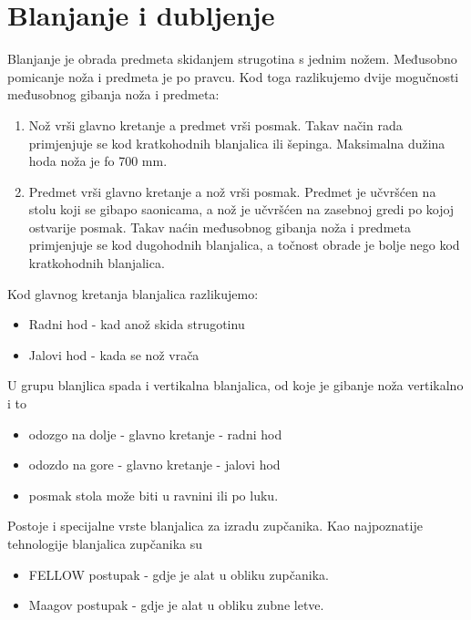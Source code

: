 \documentclass[a4paper,12pt]{article}
\numberwithin{figure}{section}
\begin{document}
\section{Blanjanje i dubljenje}
Blanjanje je obrada predmeta skidanjem strugotina s jednim nožem. Međusobno pomicanje noža i predmeta je po pravcu. Kod toga razlikujemo dvije mogučnosti međusobnog gibanja noža i predmeta:
\begin{enumerate}
\item Nož vrši glavno kretanje a predmet vrši posmak. Takav način rada primjenjuje se kod kratkohodnih blanjalica ili šepinga. Maksimalna dužina hoda noža je fo 700 mm.
\item Predmet vrši glavno kretanje a nož vrši posmak. Predmet je učvršćen na stolu koji se gibapo saonicama, a nož je učvršćen na zasebnoj gredi po kojoj ostvarije posmak. Takav naćin međusobnog gibanja noža i predmeta primjenjuje se kod dugohodnih blanjalica, a točnost obrade je bolje nego kod kratkohodnih blanjalica.
\end{enumerate}
Kod glavnog kretanja blanjalica razlikujemo:
\begin{itemize}
\item Radni hod - kad anož skida strugotinu
\item Jalovi hod - kada se nož vrača
\end{itemize}
U grupu blanjlica spada i vertikalna blanjalica, od koje je gibanje noža vertikalno i to
\begin{itemize}
\item odozgo na dolje - glavno kretanje - radni hod
\item odozdo na gore - glavno kretanje - jalovi hod
\item posmak stola može biti u ravnini ili po luku.
\end{itemize}
Postoje i specijalne vrste blanjalica za izradu zupčanika. Kao najpoznatije tehnologije blanjalica zupčanika su
\begin{itemize}
\item FELLOW postupak - gdje je alat u obliku zupčanika.
\item Maagov postupak - gdje je alat u obliku zubne letve.
\end{itemize}
\end{document}
